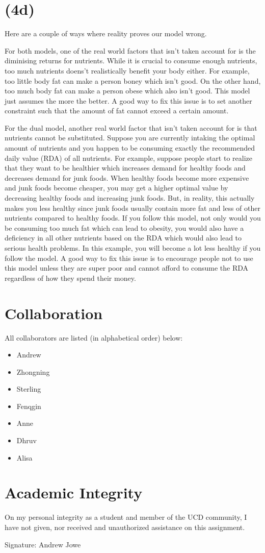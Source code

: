 \documentclass[17pt]{extarticle}
\begin{document}
\section*{(4d)}
Here are a couple of ways where reality proves our model wrong.

\bigskip For both models, one of the real world factors that isn't taken account for is the diminising returns for nutrients. While it is crucial to consume enough nutrients, too much nutrients doens't realistically benefit your body either. For example, too little body fat can make a person boney which isn't good. On the other hand, too much body fat can make a person obese which also isn't good. This model just assumes the more the better. A good way to fix this issue is to set another constraint such that the amount of fat cannot exceed a certain amount.

\bigskip For the dual model, another real world factor that isn't taken account for is that nutrients cannot be substituted. Suppose you are currently intaking the optimal amount of nutrients and you happen to be consuming exactly the recommended daily value (RDA) of all nutrients. For example, suppose people start to realize that they want to be healthier which increases demand for healthy foods and decreases demand for junk foods. When healthy foods become more expensive and junk foods become cheaper, you may get a higher optimal value by decreasing healthy foods and increasing junk foods. But, in reality, this actually makes you less healthy since junk foods usually contain more fat and less of other nutrients compared to healthy foods. If you follow this model, not only would you be consuming too much fat which can lead to obesity, you would also have a deficiency in all other nutrients based on the RDA which would also lead to serious health problems. In this example, you will become a lot less healthy if you follow the model. A good way to fix this issue is to encourage people not to use this model unless they are super poor and cannot afford to consume the RDA regardless of how they spend their money.

\section*{Collaboration}
All collaborators are listed (in alphabetical order) below:
\begin{itemize}
    \item Andrew
    \item Zhongning
    \item Sterling
    \item Fenqgin
    \item Anne
    \item Dhruv
    \item Alisa
\end{itemize}

\section*{Academic Integrity}
On my personal integrity as a student and member of the UCD community, I have not given, nor received and unauthorized assistance on this assignment.

Signature: Andrew Jowe
\end{document}
